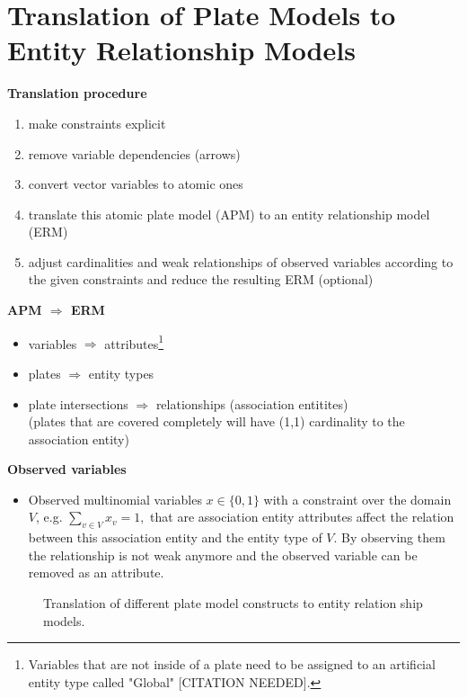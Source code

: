 \section{Translation of Plate Models to Entity Relationship Models}

\textbf{Translation procedure}
\begin{enumerate}
\item make constraints explicit
\item remove variable dependencies (arrows)
\item convert vector variables to atomic ones
\item translate this atomic plate model (APM) to an entity relationship model (ERM)
\item adjust cardinalities and weak relationships of observed variables according to the given constraints and reduce the resulting ERM (optional)
\end{enumerate}

\textbf{APM $\Rightarrow$ ERM}
\begin{itemize}
\item variables $\Rightarrow$ attributes\footnote{Variables that are not inside of a plate need to be assigned to an artificial entity type called "Global" [CITATION NEEDED].}
\item plates $\Rightarrow$ entity types
\item plate intersections $\Rightarrow$ relationships (association entitites)\\
	(plates that are covered completely will have (1,1) cardinality to the association entity)
\end{itemize}

\textbf{Observed variables}
\begin{itemize}
\item Observed multinomial variables $x \in \{0,1\}$ with a constraint over the domain $V$, e.g. $\sum_{v \in V} x_v = 1,$ that are association entity attributes affect the relation between this association entity and the entity type of $V$. By observing them the relationship is not weak anymore and the observed variable can be removed as an attribute.
\end{itemize}

\begin{figure}
\resizebox{1\linewidth}{!}{}
\caption{Translation of different plate model constructs to entity relation ship models.}\label{fig:pm2erm}
\end{figure}
